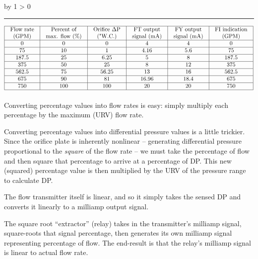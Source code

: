 \documentclass[12pt,a4paper]{article}
\def\notes{
           \advance\explnum by 1
           \ifnum \explnum > 0
                \hrule
                \vskip 3pt
                \leftline{Notes \the\explnum}
                \vskip 3pt \fi}
\begin{document}
\notes{} 


$$\vbox{\offinterlineskip
\halign{\strut
\vrule \quad\hfil # \ \hfil & 
\vrule \quad\hfil # \ \hfil & 
\vrule \quad\hfil # \ \hfil & 
\vrule \quad\hfil # \ \hfil & 
\vrule \quad\hfil # \ \hfil & 
\vrule \quad\hfil # \ \hfil \vrule \cr
\noalign{\hrule}
%
Flow rate & Percent of & Orifice $\Delta$P & FT output & FY output & FI indication \cr
%
(GPM) & max. flow (\%) & ("W.C.) & signal (mA) & signal (mA) & (GPM) \cr
%
\noalign{\hrule}
%
0 & 0 & 0 & 4 & 4 & 0 \cr
%
\noalign{\hrule}
%
75  & 10 & 1 & 4.16 & 5.6 & 75 \cr
%
\noalign{\hrule}
%
187.5  & 25 & 6.25 & 5 & 8 & 187.5 \cr
%
\noalign{\hrule}
%
375 & 50 & 25 & 8 & 12 & 375 \cr
%
\noalign{\hrule}
%
562.5 & 75 & 56.25 & 13 & 16 & 562.5 \cr
%
\noalign{\hrule}
%
675 & 90 & 81 & 16.96 & 18.4 & 675 \cr
%
\noalign{\hrule}
%
750 & 100 & 100 & 20 & 20 & 750 \cr
%
\noalign{\hrule}
} %
}$$ %

Converting percentage values into flow rates is easy: simply multiply each percentage by the maximum (URV) flow rate.

\vskip 10pt

Converting percentage values into differential pressure values is a little trickier.  Since the orifice plate is inherently nonlinear -- generating differential pressure proportional to the {\it square} of the flow rate -- we must take the percentage of flow and then square that percentage to arrive at a percentage of DP.  This new (squared) percentage value is then multiplied by the URV of the pressure range to calculate DP.

\vskip 10pt

The flow transmitter itself is linear, and so it simply takes the sensed DP and converts it linearly to a milliamp output signal.

\vskip 10pt

The square root ``extractor'' (relay) takes in the transmitter's milliamp signal, square-roots that signal percentage, then generates its own milliamp signal representing percentage of flow.  The end-result is that the relay's milliamp signal is linear to actual flow rate.

\end{document}
